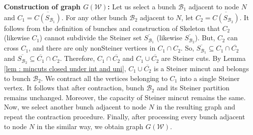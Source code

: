 \documentclass[letterpaper,11pt]{article}
\begin{document}
\noindent
\textbf{Construction of graph $G({\mathcal W})$:}
Let us select a bunch ${\mathcal B}_1$ adjacent to node $N$ and $C_1=\overline{C(S_{{\mathcal B}_1})}$. 
For any other bunch ${\mathcal B}_2$ adjacent to $N$, let $C_2=\overline{C(S_{{\mathcal B}_2})}$. It follows from the definition of bunches and construction of Skeleton that $C_2$ (likewise $C_1$) cannot subdivide the Steiner set $\overline{S_{{\mathcal B}_1}}$ (likewise $\overline{S_{{\mathcal B}_2}}$). But, $C_2$ can cross $C_1$, and there are only nonSteiner vertices in $C_1\cap C_2$. So, $\overline{S_{{\mathcal B}_1}}\subseteq C_1\cap \overline{C_2}$ and $\overline{S_{{\mathcal B}_2}}\subseteq \overline{C_1}\cap C_2$. Therefore, $C_1\cap \overline{C_2}$ and $C_1\cup \overline{C_2}$ are Steiner cuts. By Lemma \ref{lem : mincuts closed under int and uni}, $C_1\cup \overline{C_2}$ is a Steiner mincut and belongs to bunch ${\mathcal B}_2$.
We contract all the vertices belonging to $C_1$ into a single Steiner vertex. It follows that after contraction, bunch ${\mathcal B}_2$ and its Steiner partition remains unchanged. Moreover, the capacity of Steiner mincut remains the same. Now, we select another bunch adjacent to node $N$ in the resulting graph and repeat the contraction procedure. Finally, after processing every bunch adjacent to node $N$ in the similar way, we obtain graph $G({\mathcal W})$.\\


 
\end{document}
